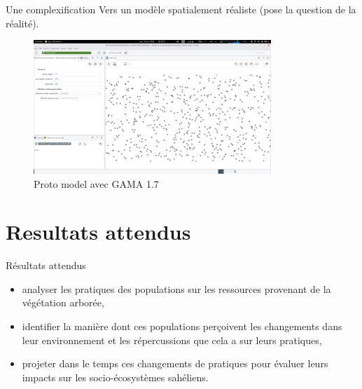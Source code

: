 \documentclass[newPxFont]{beamer}
\begin{document}
\begin{frame}[c]{Une complexification}
\vspace{-1cm}
Vers un modèle spatialement réaliste (pose la question de la réalité).

\begin{figure}
	\centering
	\includegraphics[width = 0.8\textwidth]{img/gama_ferlo}
	\caption{Proto model avec GAMA 1.7}
\end{figure}
\end{frame}



\section{Resultats attendus}



\begin{frame}[c]{Résultats attendus}
\vspace{-1cm}
\begin{itemize}
  \item analyser les pratiques des populations sur les ressources provenant de la végétation arborée,
  \item identifier la manière dont ces populations perçoivent les changements dans leur environnement et les répercussions que cela a sur leurs pratiques,
  \item projeter dans le temps ces changements de pratiques pour évaluer leurs impacts sur les socio-écosystèmes sahéliens.
\end{itemize}
\end{frame}
\end{document}
